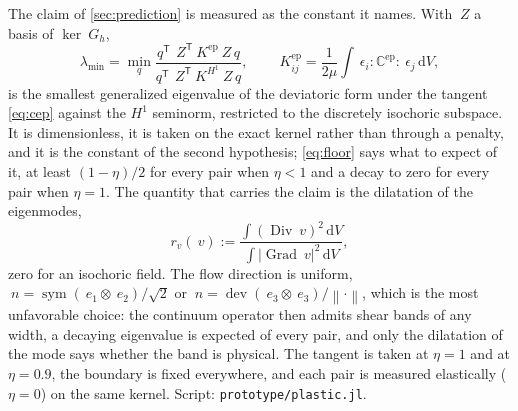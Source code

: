 \documentclass{article}
\newcommand{\eps}{~\epsilon}
\newcommand{\Grad}{\operatorname{Grad}}
\newcommand{\Div}{\operatorname{Div}}
\newcommand{\dev}{\operatorname{dev}}
\newcommand{\sym}{\operatorname{sym}}
\newcommand{\transpose}[1]{#1^{\mathsf{T}}}
\newcommand{\norm}[1]{\left\lVert #1 \right\rVert}
\newcommand{\diff}{\,\mathrm{d}}
\newcommand{\code}[1]{\texttt{#1}}
\theoremstyle{definition}
\theoremstyle{plain}
\begin{document}
The claim of \cref{sec:prediction} is measured as the constant it names. With
$~Z$ a basis of $\ker ~G_h$,
\begin{equation}
  \label{eq:coercivity}
  \lambda_{\min} = \min_{q}
    \frac{\transpose{q}\,\transpose{~Z} ~K^{\mathrm{ep}} ~Z\, q}
         {\transpose{q}\,\transpose{~Z} ~K^{H^1} ~Z\, q},
  \qquad
  ~K^{\mathrm{ep}}_{ij} = \frac{1}{2\mu}\int \eps_i : \mathbb{C}^{\mathrm{ep}} : \eps_j \diff V,
\end{equation}
is the smallest generalized eigenvalue of the deviatoric form under the
tangent \eqref{eq:cep} against the $H^1$ seminorm, restricted to the
discretely isochoric subspace. It is dimensionless, it is taken on the exact
kernel rather than through a penalty, and it is the constant of the second
hypothesis; \eqref{eq:floor} says what to expect of it, at least
$(1-\eta)/2$ for every pair when $\eta < 1$ and a decay to zero for every
pair when $\eta = 1$. The quantity that carries the claim is the dilatation
of the eigenmodes,
\begin{equation}
  \label{eq:rv}
  r_v(~v) := \frac{\int (\Div ~v)^2 \diff V}{\int \lvert\Grad ~v\rvert^2 \diff V},
\end{equation}
zero for an isochoric field. The flow direction is uniform, $~n =
\sym(~e_1 \otimes ~e_2)/\sqrt{2}$ or $~n = \dev(~e_3 \otimes ~e_3)/\norm{\cdot}$,
which is the most unfavorable choice: the continuum operator then admits shear
bands of any width, a decaying eigenvalue is expected of every pair, and only
the dilatation of the mode says whether the band is physical. The tangent is
taken at $\eta = 1$ and at $\eta = 0.9$, the boundary is fixed everywhere,
and each pair is measured elastically ($\eta = 0$) on the same kernel.
Script: \code{prototype/plastic.jl}.
\end{document}
